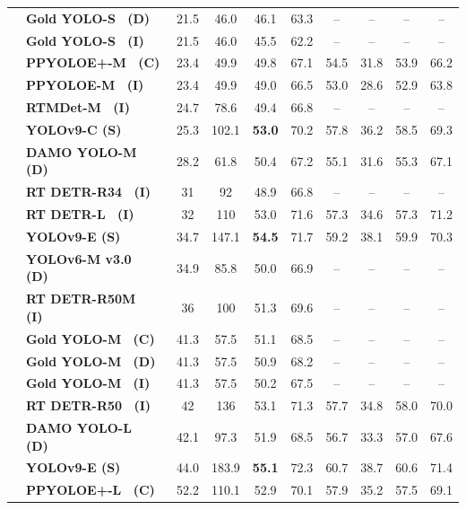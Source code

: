 \documentclass[10pt,twocolumn,letterpaper]{article}
\begin{document}
\begin{table}[t]
\begin{threeparttable}[t]
\begin{tabular}{l|lcccccccc}
				& \textbf{Gold YOLO-S~\cite{wang2023gold} (D)} & 21.5 & 46.0 & 46.1 & 63.3 & -- & -- & -- & -- \\
				& \textbf{Gold YOLO-S~\cite{wang2023gold} (I)} & 21.5 & 46.0 & 45.5 & 62.2 & -- & -- & -- & -- \\
				& \textbf{PPYOLOE+-M~\cite{xu2022pp} (C)} & 23.4 & 49.9 & 49.8 & 67.1 & 54.5 & 31.8 & 53.9 & 66.2 \\
				& \textbf{PPYOLOE-M~\cite{xu2022pp} (I)} & 23.4 & 49.9 & 49.0 & 66.5 & 53.0 & 28.6 & 52.9 & 63.8 \\
				& \textbf{RTMDet-M~\cite{lyu2022rtmdet} (I)} & 24.7 & 78.6 & 49.4 & 66.8 & -- & -- & -- & -- \\
				& \textbf{YOLOv9-C (S)} & 25.3 & 102.1 & \textbf{53.0} & 70.2 & 57.8 & 36.2 & 58.5 & 69.3 \\
				& \textbf{DAMO YOLO-M~\cite{xu2022damo} (D)} & 28.2 & 61.8 & 50.4 & 67.2 & 55.1 & 31.6 & 55.3 & 67.1 \\
				& \textbf{RT DETR-R34~\cite{lv2023detrs} (I)} & 31 & 92 & 48.9 & 66.8 & -- & -- & -- & -- \\
				& \textbf{RT DETR-L~\cite{lv2023detrs} (I)} & 32 & 110 & 53.0 & 71.6 & 57.3 & 34.6 & 57.3 & 71.2 \\
				& \textbf{YOLOv9-E (S)} & 34.7 & 147.1 & \textbf{54.5} & 71.7 & 59.2 & 38.1 & 59.9 & 70.3 \\
				& \textbf{YOLOv6-M v3.0~\cite{li2023yolov6} (D)} & 34.9 & 85.8 & 50.0 & 66.9 & -- & -- & -- & -- \\
				& \textbf{RT DETR-R50M~\cite{lv2023detrs} (I)} & 36 & 100 & 51.3 & 69.6 & -- & -- & -- & -- \\
				& \textbf{Gold YOLO-M~\cite{wang2023gold} (C)} & 41.3 & 57.5 & 51.1 & 68.5 & -- & -- & -- & -- \\
				& \textbf{Gold YOLO-M~\cite{wang2023gold} (D)} & 41.3 & 57.5 & 50.9 & 68.2 & -- & -- & -- & -- \\
				& \textbf{Gold YOLO-M~\cite{wang2023gold} (I)} & 41.3 & 57.5 & 50.2 & 67.5 & -- & -- & -- & -- \\
				& \textbf{RT DETR-R50~\cite{lv2023detrs} (I)} & 42 & 136 & 53.1 & 71.3 & 57.7 & 34.8 & 58.0 & 70.0 \\
				& \textbf{DAMO YOLO-L~\cite{xu2022damo} (D)} & 42.1 & 97.3 & 51.9 & 68.5 & 56.7 & 33.3 & 57.0 & 67.6 \\
				& \textbf{YOLOv9-E (S)} & 44.0 & 183.9 & \textbf{55.1} & 72.3 & 60.7 & 38.7 & 60.6 & 71.4 \\
				& \textbf{PPYOLOE+-L~\cite{xu2022pp} (C)} & 52.2 & 110.1 & 52.9 & 70.1 & 57.9 & 35.2 & 57.5 & 69.1 \\

\end{tabular}
\end{threeparttable}
\end{table}
\end{document}
